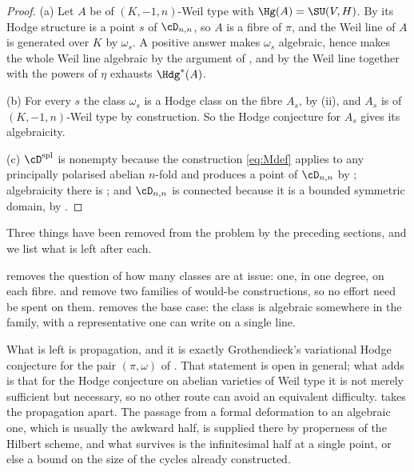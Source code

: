 \begin{proof}
(a) Let $A$ be of $(K,-1,n)$-Weil type with $\Hg(A)=\SU(V,H)$. By
 its Hodge structure is a point $s$ of $\cD_{n,n}$, so
$A$ is a fibre of $\pi$, and the Weil line of $A$ is generated over $K$ by
$\omega_{s}$. A positive answer makes $\omega_{s}$ algebraic, hence makes the
whole Weil line algebraic by the argument of , and by
 the Weil line together with the powers of $\eta$ exhausts
$\Hdg^{*}(A)$.

(b) For every $s$ the class $\omega_{s}$ is a Hodge class on the fibre $A_{s}$,
by (ii), and $A_{s}$ is of $(K,-1,n)$-Weil type by
construction. So the Hodge conjecture for $A_{s}$ gives its algebraicity.

(c) $\cD^{\mathrm{spl}}$ is nonempty because the construction \eqref{eq:Mdef}
applies to any principally polarised abelian $n$-fold and produces a point of
$\cD_{n,n}$ by ; algebraicity there is
; and $\cD_{n,n}$ is connected because it is a
bounded symmetric domain, by .
\end{proof}

\begin{remark}\label{rem:target}
Three things have been removed from the problem by the preceding sections, and
we list what is left after each.

 removes the question of how many classes are at issue:
one, in one degree, on each fibre.  and
 remove two families of would-be constructions, so no
effort need be spent on them.  removes the base case: the
class is algebraic somewhere in the family, with a representative one can
write on a single line.

What is left is propagation, and it is exactly Grothendieck's variational
Hodge conjecture for the pair $(\pi,\omega)$ of . That
statement is open in general; what  adds is that for the
Hodge conjecture on abelian varieties of Weil type it is not merely sufficient
but necessary, so no other route can avoid an equivalent difficulty.
 takes the propagation apart. The passage from a formal
deformation to an algebraic one, which is usually the awkward half, is
supplied there by properness of the Hilbert scheme, and what survives is the
infinitesimal half at a single point, or else a bound on the size of the
cycles already constructed.
\end{remark}

